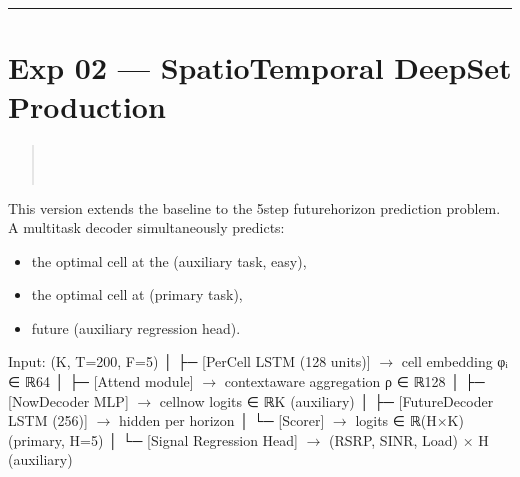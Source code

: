\documentclass[letterpaper,10pt,english]{sphinxmanual}
\begin{document}
\bigskip\hrule\bigskip



\section{Exp 02 — SpatioTemporal DeepSet Production}
\label{\detokenize{architecture:exp-02-spatiotemporal-deepset-production}}\begin{quote}

\sphinxAtStartPar
{} \\
 \\
 
\end{quote}

\sphinxAtStartPar
This version extends the baseline to the 5\sphinxhyphen{}step future\sphinxhyphen{}horizon prediction problem. A multi\sphinxhyphen{}task decoder simultaneously predicts:
\begin{itemize}
\item {} 
\sphinxAtStartPar
the optimal cell at the  (auxiliary task, easy),

\item {} 
\sphinxAtStartPar
the optimal cell at  (primary task),

\item {} 
\sphinxAtStartPar
future  (auxiliary regression head).

\end{itemize}

\begin{sphinxVerbatim}[commandchars=\\\{\}]
Input: (K, T=200, F=5)
    │
    ├─ [Per\PYGZhy{}Cell LSTM (128 units)] \(\rightarrow\) cell embedding φᵢ ∈ ℝ\PYGZca{}64
    │
    ├─ [Attend module] \(\rightarrow\) context\PYGZhy{}aware aggregation ρ ∈ ℝ\PYGZca{}128
    │
    ├─ [Now\PYGZhy{}Decoder MLP] \(\rightarrow\) cell\PYGZus{}now logits ∈ ℝ\PYGZca{}K         (auxiliary)
    │
    ├─ [Future\PYGZhy{}Decoder LSTM (256)] \(\rightarrow\) hidden per horizon
    │       └─ [Scorer] \(\rightarrow\) logits ∈ ℝ\PYGZca{}(H×K)              (primary, H=5)
    │
    └─ [Signal Regression Head] \(\rightarrow\) (RSRP, SINR, Load) × H  (auxiliary)
\end{sphinxVerbatim}
\end{document}
